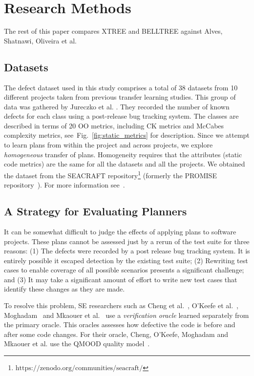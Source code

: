 \documentclass[smallextended]{svjour3}       %
\newcommand{\fig}[1]{Fig.~\ref{fig:#1}}
\begin{document}
\section{Research Methods}
\label{sect:prelim}

The rest of this paper compares XTREE and BELLTREE against  
Alves, Shatnawi, Oliveira et al. 

\subsection{Datasets}
\label{sect:data}
The defect dataset used in this study comprises a total of 38 datasets from 10 different projects taken from previous transfer learning studies. This group of data was gathered by Jureczko et al. \cite{Jureczko2010}. They recorded the number of known defects for each class using a post-release bug tracking system. The classes are described in terms of 20 OO metrics, including CK metrics and McCabes complexity metrics, see~\fig{static_metrics} for description. Since we attempt to learn plans from within the project and across projects, we explore \textit{homogeneous} transfer of plans. Homogeneity requires that the attributes (static code metrics) are the same for all the datasets and all the projects. We obtained the dataset from the SEACRAFT repository\footnote{$\text{https://zenodo.org/communities/seacraft/}$} (formerly the PROMISE repository~\cite{menzies2016promise}). For more information see~\cite{krishna16}. 



\subsection{A Strategy for Evaluating Planners}

It can be somewhat difficult to judge the effects of applying plans
to software projects. These plans cannot be assessed just by a rerun of the test suite for three reasons: (1) The defects were recorded by a post release bug tracking system. It is entirely possible it escaped detection by the existing test suite; (2) Rewriting test cases to enable coverage of all possible scenarios presents a significant challenge; and (3) It may take a significant amount of effort to write new test cases that identify these changes as they are made.

To resolve this problem, SE researchers such as
Cheng et al.~\cite{Cheng10}, O'Keefe et al.~\cite{OKeeffe08, OKeeffe07}, 
Moghadam~\cite{Moghadam2011} and Mkaouer et al.~\cite{Mkaouer14}
use a {\em verification oracle} learned separately from the primary oracle. This oracles assesses how defective the code is before and after some code changes. For their oracle, Cheng, O'Keefe, Moghadam and Mkaouer et al. use the QMOOD quality model~\cite{Bansiya02}.
\end{document}
